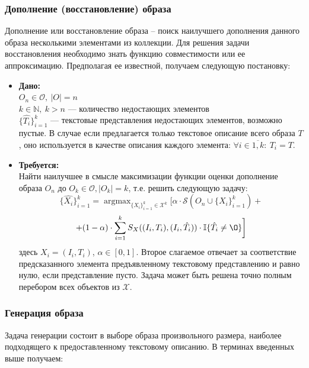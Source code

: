 \documentclass[a4paper,14pt]{extarticle}
\DeclareMathOperator*{\argmax}{argmax}
\begin{document}
			
			\subsubsection{Дополнение (восстановление) образа}
				Дополнение или восстановление образа -- поиск наилучшего дополнения данного образа несколькими элементами из коллекции. Для решения задачи восстановления необходимо знать функцию совместимости или ее аппроксимацию. Предполагая ее известной, получаем следующую постановку:
				\begin{itemize}
					\item[] \textbf{Дано:}\\
					$O_n\in\mathcal{O}, ~|O| = n$ \\
					$k \in \mathbb{N}, ~k> n$ --- количество недостающих элементов\\
					$\{\hat{T_i}\}_{i=1}^k$ --- текстовые представления недостающих элементов, возможно пустые. В случае если предлагается только текстовое описание всего образа $T$, оно используется в качестве описания каждого элемента: $\forall i \in \overline{1,k}: ~T_i = T$.
					
					\item[] \textbf{Требуется:}\\
					Найти наилучшее в смысле максимизации функции оценки дополнение образа $O_n$ до $O_k\in\mathcal{O}, |O_k|=k$, т.е. решить следующую задачу:
					$$\{\hat{X_i}\}_{i=1}^k= \argmax_{\{X_i\}_{i=1}^k\in \mathcal{X}^k} \biggr[\alpha \cdot \mathcal{S}\left(O_n\cup\{X_i\}_{i=1}^k\right) + $$
					$$+ (1-\alpha) \cdot \sum\limits_{i=1}^k S_X((I_i, T_i), (I_i, \hat{T_i}))\cdot\mathbb{I}\{\hat{T_i}\neq\O\}  \biggr]$$				
					здесь $X_i = (I_i, T_i)$, $\alpha\in[0,1]$. Второе слагаемое отвечает за соответствие предсказанного элемента предъявленному текстовому представлению и равно нулю, если представление пусто. Задача может быть решена точно полным перебором всех объектов из $\mathcal{X}$.
				\end{itemize}
			
			\subsubsection{Генерация образа}
				Задача генерации состоит в выборе образа произвольного размера, наиболее подходящего к предоставленному текстовому описанию. В терминах введенных выше получаем:
			
\end{document}
